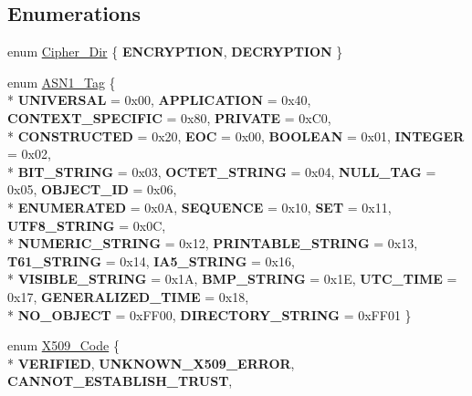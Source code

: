 \subsection*{Enumerations}
\begin{DoxyCompactItemize}
\item 
enum \hyperlink{namespaceBotan_ad9d14ffdc73fc19966421979b32ee759}{Cipher\-\_\-\-Dir} \{ {\bfseries E\-N\-C\-R\-Y\-P\-T\-I\-O\-N}, 
{\bfseries D\-E\-C\-R\-Y\-P\-T\-I\-O\-N}
 \}
\item 
enum \hyperlink{namespaceBotan_aaa08f67a945ef195fa39e62659dffa7a}{A\-S\-N1\-\_\-\-Tag} \{ \\*
{\bfseries U\-N\-I\-V\-E\-R\-S\-A\-L} = 0x00, 
{\bfseries A\-P\-P\-L\-I\-C\-A\-T\-I\-O\-N} = 0x40, 
{\bfseries C\-O\-N\-T\-E\-X\-T\-\_\-\-S\-P\-E\-C\-I\-F\-I\-C} = 0x80, 
{\bfseries P\-R\-I\-V\-A\-T\-E} = 0x\-C0, 
\\*
{\bfseries C\-O\-N\-S\-T\-R\-U\-C\-T\-E\-D} = 0x20, 
{\bfseries E\-O\-C} = 0x00, 
{\bfseries B\-O\-O\-L\-E\-A\-N} = 0x01, 
{\bfseries I\-N\-T\-E\-G\-E\-R} = 0x02, 
\\*
{\bfseries B\-I\-T\-\_\-\-S\-T\-R\-I\-N\-G} = 0x03, 
{\bfseries O\-C\-T\-E\-T\-\_\-\-S\-T\-R\-I\-N\-G} = 0x04, 
{\bfseries N\-U\-L\-L\-\_\-\-T\-A\-G} = 0x05, 
{\bfseries O\-B\-J\-E\-C\-T\-\_\-\-I\-D} = 0x06, 
\\*
{\bfseries E\-N\-U\-M\-E\-R\-A\-T\-E\-D} = 0x0\-A, 
{\bfseries S\-E\-Q\-U\-E\-N\-C\-E} = 0x10, 
{\bfseries S\-E\-T} = 0x11, 
{\bfseries U\-T\-F8\-\_\-\-S\-T\-R\-I\-N\-G} = 0x0\-C, 
\\*
{\bfseries N\-U\-M\-E\-R\-I\-C\-\_\-\-S\-T\-R\-I\-N\-G} = 0x12, 
{\bfseries P\-R\-I\-N\-T\-A\-B\-L\-E\-\_\-\-S\-T\-R\-I\-N\-G} = 0x13, 
{\bfseries T61\-\_\-\-S\-T\-R\-I\-N\-G} = 0x14, 
{\bfseries I\-A5\-\_\-\-S\-T\-R\-I\-N\-G} = 0x16, 
\\*
{\bfseries V\-I\-S\-I\-B\-L\-E\-\_\-\-S\-T\-R\-I\-N\-G} = 0x1\-A, 
{\bfseries B\-M\-P\-\_\-\-S\-T\-R\-I\-N\-G} = 0x1\-E, 
{\bfseries U\-T\-C\-\_\-\-T\-I\-M\-E} = 0x17, 
{\bfseries G\-E\-N\-E\-R\-A\-L\-I\-Z\-E\-D\-\_\-\-T\-I\-M\-E} = 0x18, 
\\*
{\bfseries N\-O\-\_\-\-O\-B\-J\-E\-C\-T} = 0x\-F\-F00, 
{\bfseries D\-I\-R\-E\-C\-T\-O\-R\-Y\-\_\-\-S\-T\-R\-I\-N\-G} = 0x\-F\-F01
 \}
\item 
enum \hyperlink{namespaceBotan_a4ff69afd30e1161d59676bae61c86ab5}{X509\-\_\-\-Code} \{ \\*
{\bfseries V\-E\-R\-I\-F\-I\-E\-D}, 
{\bfseries U\-N\-K\-N\-O\-W\-N\-\_\-\-X509\-\_\-\-E\-R\-R\-O\-R}, 
{\bfseries C\-A\-N\-N\-O\-T\-\_\-\-E\-S\-T\-A\-B\-L\-I\-S\-H\-\_\-\-T\-R\-U\-S\-T}, 

\end{DoxyCompactItemize}
